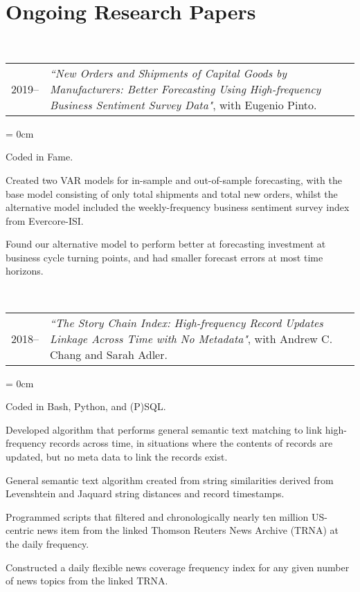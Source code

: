 \documentclass[a4paper, 11pt]{article}
\begin{document}
  \section{Ongoing Research Papers}
    ~\begin{tabular}{lP{15cm}}
      2019--& \textit{``New Orders and Shipments of Capital Goods by Manufacturers: Better Forecasting Using} \textit{High-frequency Business Sentiment Survey Data"}, with Eugenio Pinto.
    \end{tabular}

    \begin{compactitem}\parskip = 0cm
      \item Coded in Fame.
      \item Created two VAR models for in-sample and out-of-sample forecasting, with the base model consisting of only total shipments and total new orders, whilst the alternative model included the weekly-frequency business sentiment survey index from Evercore-ISI.
      \item Found our alternative model to perform better at forecasting investment at business cycle turning points, and had smaller forecast errors at most time horizons.
    \end{compactitem}

    \vspace*{1em}

    ~\begin{tabular}{lP{15cm}}
      2018--& \textit{``The Story Chain Index: High-frequency Record Updates Linkage Across Time with No Metadata"}, with Andrew C. Chang and Sarah Adler.
    \end{tabular}

    \begin{compactitem}\parskip = 0cm
      \item Coded in Bash, Python, and (P)SQL.
      \item Developed algorithm that performs general semantic text matching to link high-frequency records across time, in situations where the contents of records are updated, but no meta data to link the records exist.
      \item General semantic text algorithm created from string similarities derived from Levenshtein and Jaquard string distances and record timestamps.
      \item Programmed scripts that filtered and chronologically nearly ten million US-centric news item from the linked Thomson Reuters News Archive (TRNA) at the daily frequency.
      \item Constructed a daily flexible news coverage frequency index for any given number of news topics from the linked TRNA.
    \end{compactitem}
\end{document}
